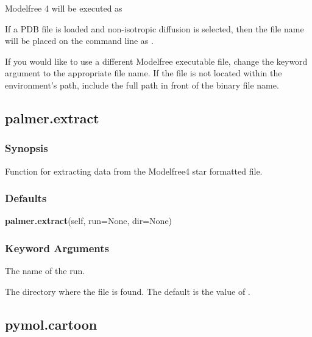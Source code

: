 Modelfree 4 will be executed as 
  


 If a PDB file is loaded and non-isotropic diffusion is selected, then the file name will be placed on the command line as . 
  

 If you would like to use a different Modelfree executable file, change the keyword argument  to the appropriate file name.  If the file is not located within the environment's path, include the full path in front of the binary file name. 
  

  

 \newpage 

 \subsection{palmer.extract} 

  
 \subsubsection{Synopsis} 

 Function for extracting data from the Modelfree4  star formatted file. 
  

  
 \subsubsection{Defaults} 

 \textsf{\textbf{palmer.extract}(self, run=None, dir=None)} 

  
 \subsubsection{Keyword Arguments} 

   The name of the run.   

   The directory where the file  is found.  The default is the value of .  

  

  

 \newpage 

 \subsection{pymol.cartoon} 

